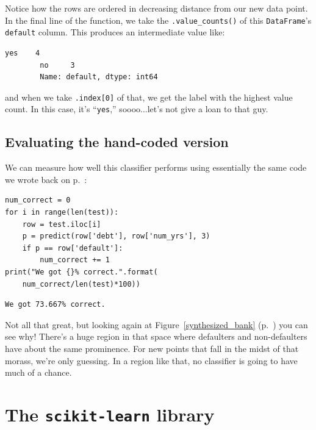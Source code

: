 
Notice how the rows are ordered in decreasing distance from our new data
point. In the final line of the function, we take the \texttt{.value\_counts()}
of this \texttt{DataFrame}'s \texttt{default} column. This produces an
intermediate value like:

\begin{Verbatim}[fontsize=\small,samepage=true,frame=leftline,framesep=5mm,framerule=1mm]
        yes    4
        no     3
        Name: default, dtype: int64
\end{Verbatim}

and when we take \texttt{.index[0]} of that, we get the label with the highest
value count. In this case, it's ``\texttt{yes},'' soooo...let's not give a loan
to that guy.

\subsection{Evaluating the hand-coded version}

We can measure how well this classifier performs using essentially the same
code we wrote back on p.~\pageref{evaluateNBcode}:

\begin{Verbatim}[fontsize=\small,samepage=true,frame=single,framesep=3mm]
num_correct = 0
for i in range(len(test)):
    row = test.iloc[i]
    p = predict(row['debt'], row['num_yrs'], 3)
    if p == row['default']:
        num_correct += 1
print("We got {}% correct.".format(
    num_correct/len(test)*100))
\end{Verbatim}
\vspace{-.2in}

\begin{Verbatim}[fontsize=\small,samepage=true,frame=leftline,framesep=5mm,framerule=1mm]
We got 73.667% correct.
\end{Verbatim}

Not all that great, but looking again at Figure~\ref{synthesized_bank}
(p.~\pageref{synthesized_bank}) you can see why! There's a huge region in that
space where defaulters and non-defaulters have about the same prominence. For
new points that fall in the midst of that morass, we're only guessing. In a
region like that, no classifier is going to have much of a chance.

\section{The \texttt{scikit-learn} library}


